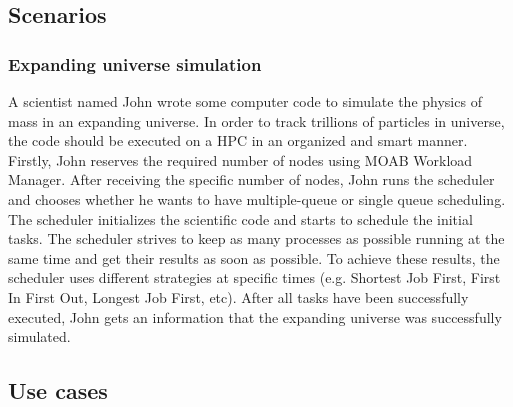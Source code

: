 \subsection{Scenarios}
			
\subsubsection{Expanding universe simulation}

A scientist named John wrote some computer code to simulate the physics of mass in an expanding universe. In order to track trillions of particles in universe, the code should be executed on a HPC in an organized and smart manner. 
Firstly, John reserves the required number of nodes using MOAB Workload Manager. After receiving the specific number of nodes, John runs the scheduler and chooses whether he wants to have multiple-queue or single queue scheduling. The scheduler initializes the scientific code and starts to schedule the initial tasks. The scheduler strives to keep as many processes as possible running at the same time and get
their results as soon as possible. To achieve these results, the scheduler uses different strategies at specific times (e.g. Shortest Job First, First In First Out, Longest Job First, etc). After all tasks have been successfully executed, John gets an information that the expanding universe was successfully simulated. 

\subsection{Use cases}

